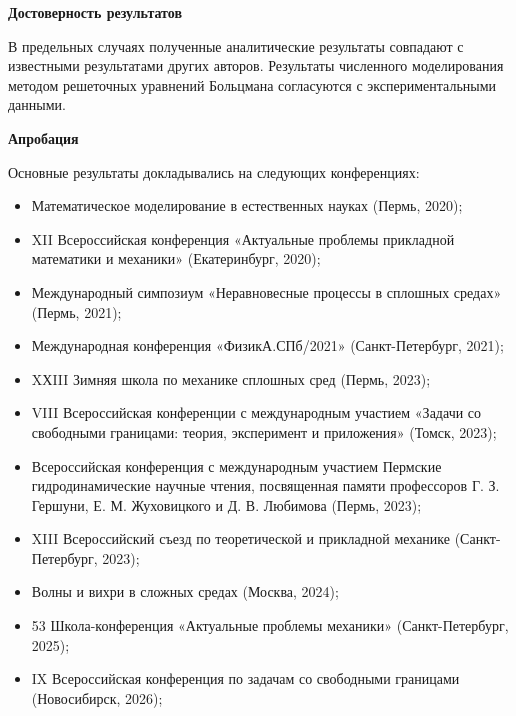 \documentclass[12pt,a4paper]{article}
\begin{document}
\textbf{Достоверность результатов}

В предельных случаях полученные аналитические результаты совпадают с известными результатами других авторов. Результаты численного моделирования методом решеточных уравнений Больцмана согласуются с экспериментальными данными. 

\textbf{Апробация}

Основные результаты докладывались на следующих конференциях:

\begin{itemize}
	\item Математическое моделирование в естественных науках (Пермь, 2020);
	
	\item XII Всероссийская конференция «Актуальные проблемы прикладной математики и механики» (Екатеринбург, 2020);
	
	\item Международный симпозиум «Неравновесные процессы в сплошных средах» (Пермь, 2021);
	
	\item Международная конференция «ФизикА.СПб/2021» (Санкт-Петербург, 2021);
	
	\item XХIII Зимняя школа по механике сплошных сред (Пермь, 2023);
	
	\item VIII Всероссийская конференции с международным участием «Задачи со свободными границами: теория, эксперимент и приложения» (Томск, 2023);
	
	\item Всероссийская конференция с международным участием Пермские гидродинамические научные чтения, посвященная памяти профессоров Г. З. Гершуни, Е. М. Жуховицкого и Д. В. Любимова (Пермь, 2023); 
	
	\item XIII Всероссийский съезд по теоретической и прикладной механике (Санкт-Петербург, 2023);
	
	
	\item Волны и вихри в сложных средах (Москва, 2024);
	
	\item 53 Школа-конференция «Актуальные проблемы механики» (Санкт-Петербург, 2025);
	
	\item IX Всероссийская конференция по задачам со свободными границами (Новосибирск, 2026);
	

\end{itemize}
\end{document}
